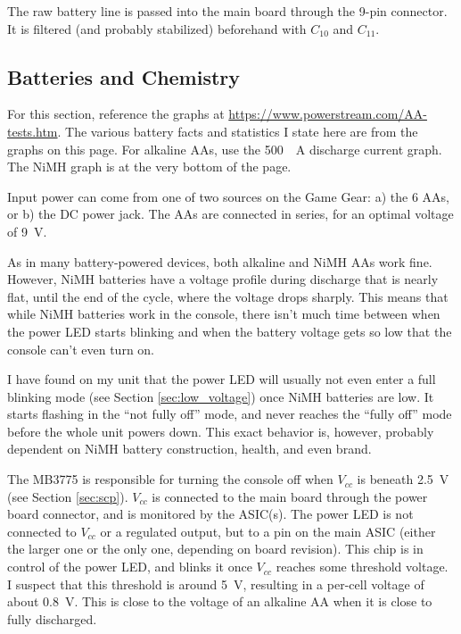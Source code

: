 \documentclass{article}
\newcommand{\Vcc}{$V_{cc}$}
\newcommand{\model}{\textsf}
\begin{document}
The raw battery line is passed into the main board through the 9-pin
connector. It is filtered (and probably stabilized) beforehand with
$C_{10}$ and $C_{11}$.

\subsection{Batteries and Chemistry}
\label{sec:batteries_chemistry}
For this section, reference the graphs at
\url{https://www.powerstream.com/AA-tests.htm}. The various battery
facts and statistics I state here are from the graphs on this
page. For alkaline AAs, use the \qty{500}{\milli{}A} discharge current
graph. The NiMH graph is at the very bottom of the page.

Input power can come from one of two sources on the Game Gear: a) the
6 AAs, or b) the DC power jack. The AAs are connected in series, for
an optimal voltage of \qty{9}{\volt}.

As in many battery-powered devices, both alkaline and NiMH AAs work
fine. However, NiMH batteries have a voltage profile during discharge
that is nearly flat, until the end of the cycle, where the voltage
drops sharply. This means that while NiMH batteries work in the
console, there isn't much time between when the power LED starts
blinking and when the battery voltage gets so low that the console
can't even turn on.

I have found on my unit that the power LED will usually not even enter
a full blinking mode (see Section \ref{sec:low_voltage}) once NiMH
batteries are low. It starts flashing in the ``not fully off'' mode,
and never reaches the ``fully off'' mode before the whole unit powers
down. This exact behavior is, however, probably dependent on NiMH
battery construction, health, and even brand.

The \model{MB3775} is responsible for turning the console off when
\Vcc{} is beneath \qty{2.5}{\volt} (see Section \ref{sec:scp}). \Vcc{}
is connected to the main board through the power board connector, and
is monitored by the ASIC(s). The power LED is not connected to \Vcc{}
or a regulated output, but to a pin on the main ASIC (either the
larger one or the only one, depending on board revision). This chip is
in control of the power LED, and blinks it once \Vcc{} reaches some
threshold voltage. I suspect that this threshold is around
\qty{5}{\volt}, resulting in a per-cell voltage of about
\qty{0.8}{\volt}. This is close to the voltage of an alkaline AA when
it is close to fully discharged.
\end{document}
